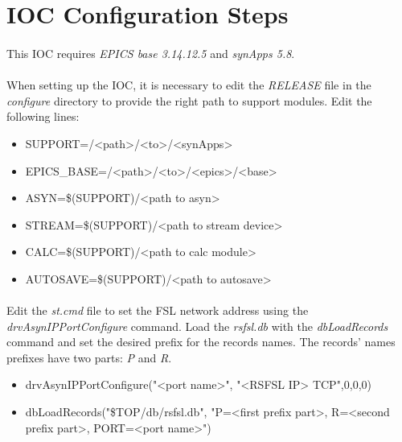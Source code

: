 \documentclass[openany]{article}
\begin{document}
\section{IOC Configuration Steps}

	\paragraph{} This IOC requires \emph{EPICS base 3.14.12.5} and \emph{synApps 5.8}.

	\paragraph{} When setting up the IOC, it is necessary to edit the \emph{RELEASE} file in the \emph{configure} directory to provide the right path to support modules. Edit the following lines:

	\begin{itemize}
		\item[] SUPPORT=/\textless path\textgreater/\textless to\textgreater/\textless synApps\textgreater
		\item[] EPICS\_BASE=/\textless path\textgreater/\textless to\textgreater/\textless epics\textgreater/\textless base\textgreater
		\item[] ASYN=\$(SUPPORT)/\textless path to asyn\textgreater
		\item[] STREAM=\$(SUPPORT)/\textless path to stream device\textgreater
		\item[] CALC=\$(SUPPORT)/\textless path to calc module\textgreater
		\item[] AUTOSAVE=\$(SUPPORT)/\textless path to autosave\textgreater
	\end{itemize}

	\paragraph{} Edit the \emph{st.cmd} file to set the FSL network address using the \emph{drvAsynIPPortConfigure} command. Load the \emph{rsfsl.db} with the \emph{dbLoadRecords} command and set the desired prefix for the records names. The records' names prefixes have two parts: \emph{P} and \emph{R}.

	\begin{itemize}
		\item[] drvAsynIPPortConfigure("\textless port name\textgreater", "\textless RSFSL IP{\textgreater} TCP",0,0,0)
		\item[] dbLoadRecords("\${TOP}/db/rsfsl.db", "P=\textless first prefix part\textgreater, R=\textless second prefix part\textgreater, PORT=\textless port name\textgreater")
	\end{itemize}
\end{document}
